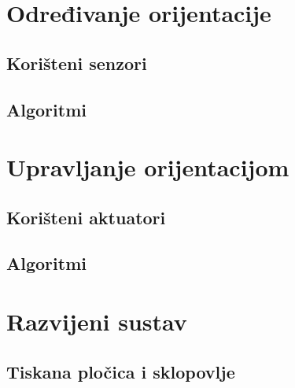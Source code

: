 \documentclass[times, utf8, diplomski, numeric]{templates/template}
\begin{document}
{    \section{Određivanje orijentacije}{
        \subsection{Korišteni senzori}{
        }

        \subsection{Algoritmi}{
        }
    }

    \section{Upravljanje orijentacijom}{
        \subsection{Korišteni aktuatori}{
        }

        \subsection{Algoritmi}{
        }
    }

    \section{Razvijeni sustav}{
        \subsection{Tiskana pločica i sklopovlje}{
        }

}}
\end{document}
